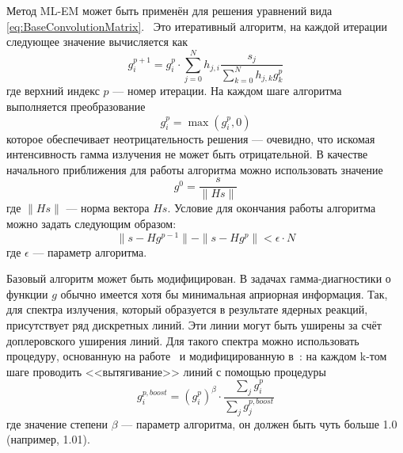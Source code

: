 Метод ML-EM \cite{Vardi1985,Richardson1972,Lucy1974} может быть применён для решения уравнений вида \ref{eq:BaseConvolutionMatrix}.~\cite{Khilkevitch2013,Shevelev2013} Это итеративный алгоритм, на каждой итерации следующее значение вычисляется как
\begin{equation*}
  g_i^{p+1} = g_i^p \cdot \sum \limits_{j = 0 }^{N} h_{j,i} \frac{ s_j }{ \sum \limits_{k=0}^{N} h_{j,k} g_k^p }
\end{equation*}
где верхний индекс $p$ --- номер итерации. На каждом шаге алгоритма выполняется преобразование 
\begin{equation*}
  g_i^p = \max \left( g_i^p, 0 \right)
\end{equation*}
которое обеспечивает неотрицательность решения --- очевидно, что искомая интенсивность гамма излучения не может быть отрицательной. В качестве начального приближения для работы алгоритма можно использовать значение
\begin{equation*}
  g^0 = \frac{ s }{ \| H s \| }
\end{equation*}
где $ \| H s \| $ --- норма вектора $ H s $. Условие для окончания работы алгоритма можно задать следующим образом:
\begin{equation*}
  \| s - H g^{p-1} \| - \| s - H g^p \| < \epsilon \cdot N
\end{equation*}
где $\epsilon$ --- параметр алгоритма.~\cite{Shevelev2013} 

Базовый алгоритм может быть модифицирован. В задачах гамма-диагностики о функции $g$ обычно имеется хотя бы минимальная априорная информация. Так, для спектра излучения, который образуется в результате ядерных реакций, присутствует ряд дискретных линий. Эти линии могут быть уширены за счёт доплеровского уширения линий. Для такого спектра можно использовать процедуру, основанную на работе~\cite{Morhac2011} и модифицированную в~\cite{Khilkevitch2013,Shevelev2013}: на каждом k-том шаге проводить <<вытягивание>> линий с помощью процедуры
\begin{equation}
  \label{eq:BoostMlemDisturb}
  g^{p, boost}_i = \left( g^p_i \right)^{\beta} \cdot \frac{ \sum_j g^p_i }{ \sum_j g^{p, boost}_j }
\end{equation}
где значение степени $\beta$ --- параметр алгоритма, он должен быть чуть больше 1.0 (например, 1.01). 

